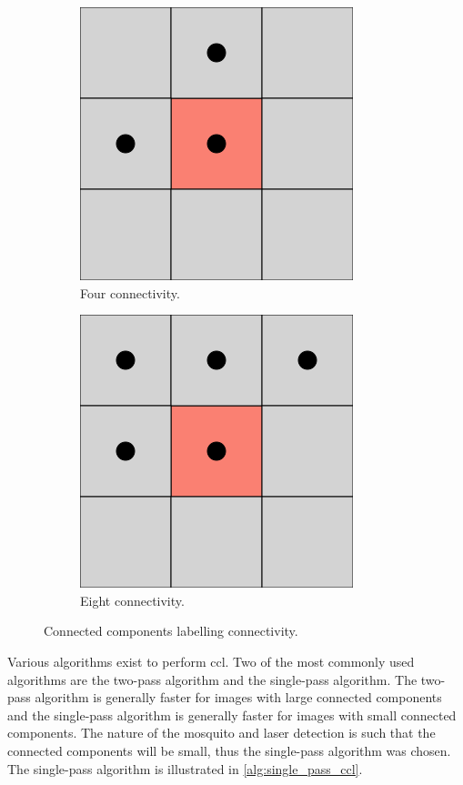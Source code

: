 \begin{figure}[h]
    \centering
    \begin{subfigure}[t]{0.45\textwidth}
        \centering
        \includegraphics[width=0.4\linewidth]{figures/detection/square_4_connectivity.png}
        \caption{Four connectivity.}
        \label{fig:four_connectivity}
    \end{subfigure}
    \begin{subfigure}[t]{0.45\textwidth}
        \centering
        \includegraphics[width=0.4\linewidth]{figures/detection/square_8_connectivity.png}
        \caption{Eight connectivity.}
        \label{fig:eight_connectivity}
    \end{subfigure}
    \caption{Connected components labelling connectivity.}
    \label{fig:ccl_connectivity}
\end{figure}

Various algorithms exist to perform \gls{ccl}. Two of the most commonly used algorithms are the two-pass algorithm and the single-pass algorithm. The two-pass algorithm is generally faster for images with large connected components and the single-pass algorithm is generally faster for images with small connected components. The nature of the mosquito and laser detection is such that the connected components will be small, thus the single-pass algorithm was chosen. The single-pass algorithm is illustrated in \autoref{alg:single_pass_ccl}.

